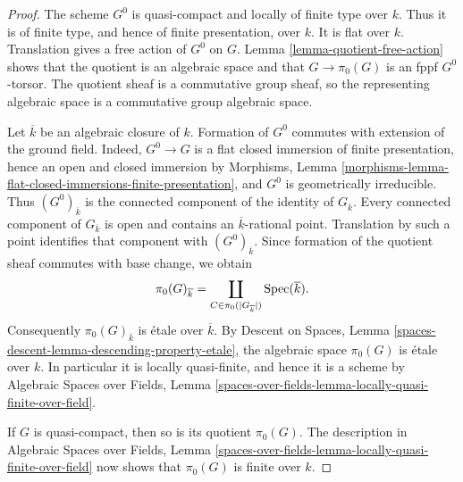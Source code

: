 \begin{proof}
The scheme $G^0$ is quasi-compact and locally of finite type over $k$.
Thus it is of finite type, and hence of finite presentation, over $k$.
It is flat over $k$. Translation gives a free action of $G^0$ on $G$.
Lemma \ref{lemma-quotient-free-action} shows that the quotient is an
algebraic space and that $G \to \pi_0(G)$ is an fppf $G^0$-torsor.
The quotient sheaf is a commutative group sheaf, so the representing
algebraic space is a commutative group algebraic space.

\medskip\noindent
Let $\overline{k}$ be an algebraic closure of $k$. Formation of $G^0$
commutes with extension of the ground field. Indeed, $G^0 \to G$ is a
flat closed immersion of finite presentation, hence an open and closed
immersion by Morphisms, Lemma
\ref{morphisms-lemma-flat-closed-immersions-finite-presentation}, and
$G^0$ is geometrically irreducible. Thus $(G^0)_{\overline{k}}$ is the
connected component of the identity of $G_{\overline{k}}$.
Every connected component of $G_{\overline{k}}$ is open and contains an
$\overline{k}$-rational point. Translation by such a point identifies that
component with $(G^0)_{\overline{k}}$. Since formation of the quotient
sheaf commutes with base change, we obtain
$$
\pi_0(G)_{\overline{k}} =
\coprod_{C \in \pi_0(|G_{\overline{k}}|)} \mathop{\mathrm{Spec}}(\overline{k}).
$$
Consequently $\pi_0(G)_{\overline{k}}$ is \'etale over $\overline{k}$.
By Descent on Spaces, Lemma
\ref{spaces-descent-lemma-descending-property-etale}, the algebraic space
$\pi_0(G)$ is \'etale over $k$. In particular it is locally quasi-finite,
and hence it is a scheme by Algebraic Spaces over Fields, Lemma
\ref{spaces-over-fields-lemma-locally-quasi-finite-over-field}.

If $G$ is quasi-compact, then so is its quotient $\pi_0(G)$. The
description in Algebraic Spaces over Fields, Lemma
\ref{spaces-over-fields-lemma-locally-quasi-finite-over-field} now shows
that $\pi_0(G)$ is finite over $k$.
\end{proof}

